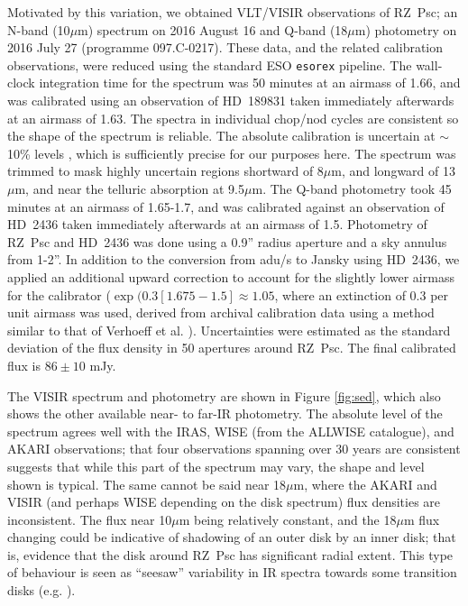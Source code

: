 \documentclass[]{rsos}
\begin{document}
Motivated by this variation, we obtained VLT/VISIR observations of RZ~Psc; an N-band
(10$\mu$m) spectrum on 2016 August 16 and Q-band (18$\mu$m) photometry on 2016 July 27
(programme 097.C-0217). These data, and the related calibration observations, were
reduced using the standard ESO \texttt{esorex} pipeline. The wall-clock integration time
for the spectrum was 50 minutes at an airmass of 1.66, and was calibrated using an
observation of HD~189831 taken immediately afterwards at an airmass of 1.63. The spectra
in individual chop/nod cycles are consistent so the shape of the spectrum is
reliable. The absolute calibration is uncertain at $\sim$10\% levels
\cite{2007A&A...476..279G}, which is sufficiently precise for our purposes here. The
spectrum was trimmed to mask highly uncertain regions shortward of 8$\mu$m, and longward
of 13 $\mu$m, and near the telluric absorption at 9.5$\mu$m. The Q-band photometry took
45 minutes at an airmass of 1.65-1.7, and was calibrated against an observation of
HD~2436 taken immediately afterwards at an airmass of 1.5. Photometry of RZ~Psc and
HD~2436 was done using a 0.9'' radius aperture and a sky annulus from 1-2''. In addition
to the conversion from adu/s to Jansky using HD~2436, we applied an additional upward
correction to account for the slightly lower airmass for the calibrator
($\exp(0.3 [1.675-1.5] \approx 1.05$, where an extinction of 0.3 per unit airmass was
used, derived from archival calibration data using a method similar to that of Verhoeff
et al. \cite{2012A&A...538A.101V}). Uncertainties were estimated as the standard
deviation of the flux density in 50 apertures around RZ~Psc. The final calibrated flux is
$86 \pm 10$ mJy.

The VISIR spectrum and photometry are shown in Figure \ref{fig:sed}, which also shows the
other available near- to far-IR photometry. The absolute level of the spectrum agrees
well with the IRAS, WISE (from the ALLWISE catalogue), and AKARI observations; that four
observations spanning over 30 years are consistent suggests that while this part of the
spectrum may vary, the shape and level shown is typical. The same cannot be said near
18$\mu$m, where the AKARI and VISIR (and perhaps WISE depending on the disk spectrum)
flux densities are inconsistent. The flux near 10$\mu$m being relatively constant, and
the 18$\mu$m flux changing could be indicative of shadowing of an outer disk by an inner
disk; that is, evidence that the disk around RZ~Psc has significant radial extent. This
type of behaviour is seen as ``seesaw'' variability in IR spectra towards some transition
disks (e.g. \cite{2011ApJ...728...49E,2012ApJ...748...71F}).
\end{document}
